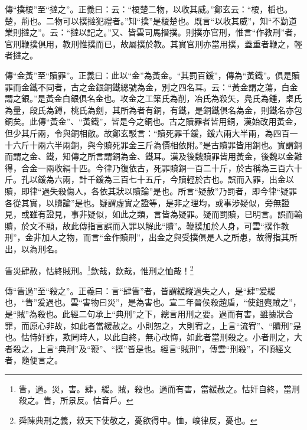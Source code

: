 {\noindent\zhuan{}\fzbyks 傳“撲榎”至“撻之”。正義曰：云：“榎楚二物，以收其威。”鄭玄云：“榎，槄也。楚，荊也。二物可以撲撻犯禮者。”知“撲”是榎楚也。既言“以收其威”，知“不勤道業則撻之”。云：“撻以記之。”又、皆雲司馬搢撲。則撲亦官刑，惟言“作教刑”者，官刑鞭撲俱用，教刑惟撲而已，故屬撲於教。其實官刑亦當用撲，蓋重者鞭之，輕者撻之。 \par}

{\noindent\zhuan{}\fzbyks 傳“金黃”至“贖罪”。正義曰：此以“金”為黃金。“其罰百鍰”，傳為“黃鐵”。俱是贖罪而金鐵不同者，古之金銀銅鐵總號為金，別之四名耳。云：“黃金謂之蕩，白金謂之銀。”是黃金白銀俱名金也。攻金之工築氏為削，冶氏為殺矢，鳧氏為鍾，㮚氏為量，段氏為鎛，桃氏為劍，其所為者有銅，有鐵，是銅鐵俱名為金，則鐵名亦包銅矣。此傳“黃金”、“黃鐵”，皆是今之銅也。古之贖罪者皆用銅，漢始改用黃金，但少其斤兩，令與銅相敵。故鄭玄駁言：“贖死罪千鍰，鍰六兩大半兩，為四百一十六斤十兩六半兩銅，與今贖死罪金三斤為價相依附。”是古贖罪皆用銅也。實謂銅而謂之金、鐵，知傳之所言謂銅為金、鐵耳。漢及後魏贖罪皆用黃金，後魏以金難得，合金一兩收絹十匹。今律乃復依古，死罪贖銅一百二十斤，於古稱為三百六十斤。孔以鍰為六兩，計千鍰為三百七十五斤，今贖輕於古也。誤而入罪，出金以贖，即律“過失殺傷人，各依其狀以贖論”是也。所言“疑赦”乃罰者，即今律“疑罪各從其實，以贖論”是也。疑謂虛實之證等，是非之理均，或事涉疑似，旁無證見，或雖有證見，事非疑似，如此之類，言皆為疑罪。疑而罰贖，已明言。誤而輸贖，於文不顯，故此傳指言誤而入罪以解此“贖”。鞭撲加於人身，可雲“撲作教刑”，金非加人之物，而言“金作贖刑”，出金之與受撲俱是人之所患，故得指其所出，以為刑名。 \par}

眚災肆赦，怙終賊刑。\footnote{眚，過。災，害。肆，緩。賊，殺也。過而有害，當緩赦之。怙奸自終，當刑殺之。眚，所景反。怙音戶。}欽哉，欽哉，惟刑之恤哉！\footnote{舜陳典刑之義，敕天下使敬之，憂欲得中。恤，峻律反，憂也。}

{\noindent\zhuan{}\fzbyks 傳“眚過”至“殺之”。正義曰：言“肆眚”者，皆謂緩縱過失之人，是“肆”爰緩也，“眚”爰過也。雲“害物曰災”，是為害也。宣二年晉侯殺趙盾，“使鉏麑賊之”，是“賊”為殺也。此經二句承上“典刑”之下，總言用刑之要。過而有害，雖據狀合罪，而原心非故，如此者當緩赦之。小則恕之，大則宥之，上言“流宥”、“贖刑”是也。怙恃奸詐，欺罔時人，以此自終，無心改悔，如此者當刑殺之。小者刑之，大者殺之，上言“典刑”及“鞭”、“撲”皆是也。經言“賊刑”，傳雲“刑殺”，不順經文者，隨便言之。 \par}

